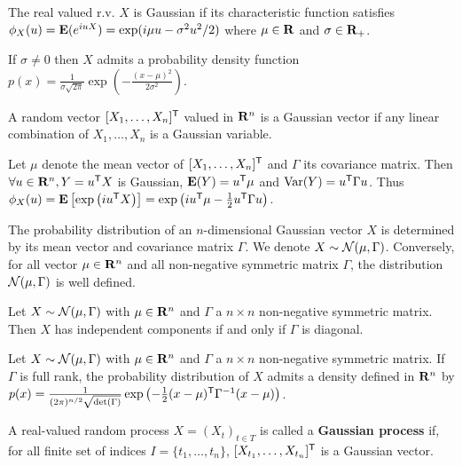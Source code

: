 	\begin{defn}
		The real valued r.v. $X$ is Gaussian if its characteristic function satisfies
		$\phi_X(u) = \mathbf{E}(e^{iuX}) = \exp(i \mu u - \sigma^2 u^2 / 2)$
		where $\mu \in \mathbf{R}$ and $\sigma \in \mathbf{R}_+$.
	\end{defn}

	If $\sigma \neq 0$ then $X$ admits a probability density function $p(x) = \frac{1}{\sigma \sqrt{2 \pi}} \exp \left( - \frac{(x - \mu)^2}{2 \sigma^2} \right)$.

	\begin{defn}
		A random vector $[X_1, \ldots, X_n]^\mathsf{T}$ valued in $\mathbf{R}^n$ is a Gaussian vector if any linear combination of $X_1, \ldots, X_n$ is a Gaussian variable.
	\end{defn}

	Let $\mu$ denote the mean vector of $[X_1, \ldots, X_n]^\mathsf{T}$ and $\Gamma$ its covariance matrix.
	Then $\forall u \in \mathbf{R}^n, Y = u^\mathsf{T} X$ is Gaussian, $\mathbf{E}(Y) = u^\mathsf{T} \mu$ and $\operatorname{Var}(Y) = u^\mathsf{T} \Gamma u$.
	Thus $\phi_X(u) = \mathbf{E} \left[ \exp \left( i u^\mathsf{T} X \right) \right] = \exp \left( i u^\mathsf{T} \mu - \frac{1}{2} u^\mathsf{T} \Gamma u \right)$.
	
	\begin{pop}
		The probability distribution of an $n$-dimensional Gaussian vector $X$ is determined by its mean vector and covariance matrix $\Gamma$.
		We denote $X \sim \mathcal{N}(\mu,\Gamma)$.
		Conversely, for all vector $\mu \in \mathbf{R}^n$ and all non-negative symmetric matrix $\Gamma$, the distribution $\mathcal{N}(\mu,\Gamma)$ is well defined.
	\end{pop}

	\begin{lem}
		Let $X \sim \mathcal{N}(\mu,\Gamma)$ with $\mu \in \mathbf{R}^n$ and $\Gamma$ a $n \times n$ non-negative symmetric matrix.
		Then $X$ has independent components if and only if $\Gamma$ is diagonal.
	\end{lem}

	\begin{pop}
		Let $X \sim \mathcal{N}(\mu,\Gamma)$ with $\mu \in \mathbf{R}^n$ and $\Gamma$ a $n \times n$ non-negative symmetric matrix.
		If $\Gamma$ is full rank, the probability distribution of $X$ admits a density defined in $\mathbf{R}^n$ by
		$p(x) = \frac{1}{(2 \pi)^{n/2} \sqrt{\det(\Gamma)}} \exp \left( - \frac{1}{2} (x - \mu)^\mathsf{T} \Gamma^{-1} (x - \mu) \right)$.
	\end{pop}

	\begin{defn}
		A real-valued random process $X = (X_t)_{t \in T}$ is called a \textbf{Gaussian process} if, for all finite set of indices $I = \{ t_1, \ldots, t_n \}$, $[X_{t_1}, \ldots, X_{t_n}]^\mathsf{T}$ is a Gaussian vector.
	\end{defn}

